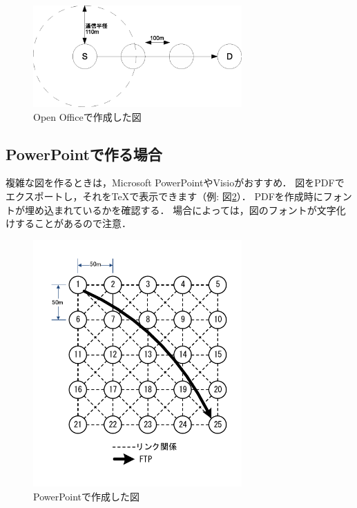 \documentclass[submit,techreq,noauthor,dvipdfmx]{eco}	%
\begin{document}
\begin{figure}[t]
    \centering
    \includegraphics[width=8cm]{fig/ex1.eps}
    \caption{Open Officeで作成した図}
    \label{fig:tgif-sample}
\end{figure}


\subsection{PowerPointで作る場合}
複雑な図を作るときは，Microsoft PowerPointやVisioがおすすめ．
図をPDFでエクスポートし，それをTeXで表示できます（例: 図\ref{fig:pdf-sample}）．
PDFを作成時にフォントが埋め込まれているかを確認する．
場合によっては，図のフォントが文字化けすることがあるので注意．

\begin{figure}[t]
    \centering
    \includegraphics[width=8cm]{fig/ex2.pdf}
    \caption{PowerPointで作成した図}
    \label{fig:pdf-sample}
\end{figure}



\setlength\baselineskip{12pt}
{\small
  
  
}
\end{document}

